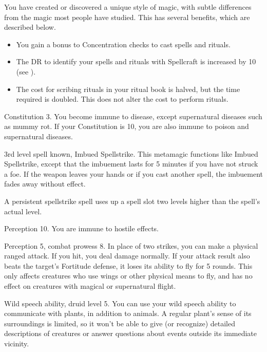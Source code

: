\featben You have created or discovered a unique style of magic, with subtle differences from the magic most people have studied.
This has several benefits, which are described below.
\begin{itemize}
    \item You gain a  bonus to Concentration checks to cast spells and rituals.
    \item The DR to identify your spells and rituals with Spellcraft is increased by 10 (see ).
    \item The cost for scribing rituals in your ritual book is halved, but the time required is doubled.
        This does not alter the cost to perform rituals.
\end{itemize}

\featpre Constitution 3.
\featben You become immune to disease, except supernatural diseases such as mummy rot.
If your Constitution is 10, you are also immune to poison and supernatural diseases.

\featpres 3rd level spell known, Imbued Spellstrike.
\featben This metamagic functions like Imbued Spellstrike, except that the imbuement lasts for 5 minutes if you have not struck a foe.
If the weapon leaves your hands or if you cast another spell, the imbuement fades away without effect.

A persistent spellstrike spell uses up a spell slot two levels higher than the spell's actual level.

\featpre Perception 10.
\featben You are immune to hostile  effects.

\featpre Perception 5, combat prowess 8.
\featben In place of two strikes, you can make a physical ranged attack.
If you hit, you deal damage normally.
If your attack result also beats the target's Fortitude defense, it loses its ability to fly for 5 rounds.
This only affects creatures who use wings or other physical means to fly, and has no effect on creatures with magical or supernatural flight.

\featpre Wild speech ability, druid level 5.
\featben You can use your wild speech ability to communicate with plants, in addition to animals.
A regular plant's sense of its surroundings is limited, so it won't be able to give (or recognize) detailed descriptions of creatures or answer questions about events outside its immediate vicinity.

